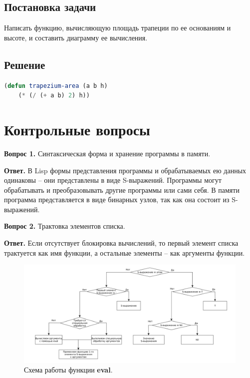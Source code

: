 \documentclass[12pt]{report}
\begin{document}
\subsection*{Постановка задачи}
Написать функцию, вычисляющую площадь трапеции по ее основаниям и высоте, и составить диаграмму ее вычисления.

\subsection*{Решение}
\begin{lstlisting}[label=4xxd,caption=Решение задания №4, language=lisp]
(defun trapezium-area (a b h)
	(* (/ (+ a b) 2) h))
\end{lstlisting}

\section*{Контрольные вопросы}
\textbf{Вопрос 1.} Синтаксическая форма и хранение программы в памяти.

\textbf{Ответ.}
В Lisp формы представления программы и обрабатываемых ею данных одинаковы – они представлены в виде S-выражений. Программы могут обрабатывать и преобразовывать другие программы или сами себя. В памяти программа представляется в виде бинарных узлов, так как она состоит из S-выражений.\newline

\textbf{Вопрос 2.} Трактовка элементов списка. 

\textbf{Ответ.}
Если отсутствует блокировка вычислений, то первый элемент списка трактуется как имя функции, а остальные элементы – как аргументы функции.\newline

\begin{figure}[H]

	\begin{center}

		\includegraphics[scale=0.4]{img/eval.png}

	\end{center}
	\caption{Схема работы функции \textbf{eval}.}

	\label{img:eval}

\end{figure}
	
\end{document}
